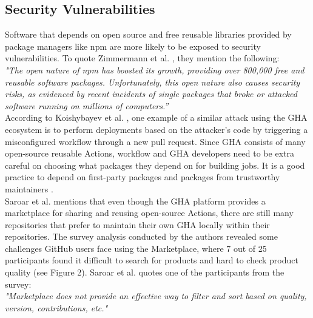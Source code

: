 \documentclass[conference]{IEEEtran}
\begin{document}
    \subsection{Security Vulnerabilities}
        Software that depends on open source and free reusable libraries provided by package managers like npm are more likely to be exposed to security vulnerabilities. To quote Zimmermann et al. \cite{zimmermann2019small}, they mention the following: \\

        \textit{"The open nature of npm has boosted its growth, providing over 800,000 free and reusable software packages. Unfortunately, this open nature also causes security risks, as evidenced by recent incidents of single packages that broke or attacked software running on millions of computers.”} \\

        According to Koishybayev et al. \cite{koishybayev2022characterizing}, one example of a similar attack using the GHA ecosystem is to perform deployments based on the attacker’s code by triggering a misconfigured workflow through a new pull request. Since GHA consists of many open-source reusable Actions, workflow and GHA developers need to be extra careful on choosing what packages they depend on for building jobs. It is a good practice to depend on first-party packages and packages from trustworthy maintainers \cite{zimmermann2019small}. \\

        Saroar et al. \cite{saroar2023developers} mentions that even though the GHA platform provides a marketplace for sharing and reusing open-source Actions, there are still many repositories that prefer to maintain their own GHA locally within their repositories. The survey analysis conducted by the authors revealed some challenges GitHub users face using the Marketplace, where 7 out of 25 participants found it difficult to search for products and hard to check product quality (see Figure 2). Saroar et al. \cite{saroar2023developers} quotes one of the participants from the survey: \\

\textit{"Marketplace does not provide an effective way to filter and sort based on quality, version, contributions, etc."}\\
\end{document}
